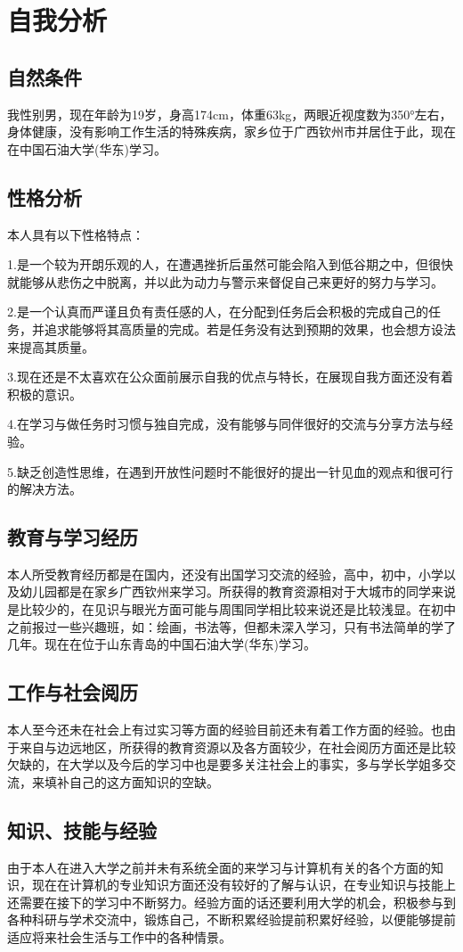 \documentclass{article}
\begin{document}
\thispagestyle{empty}
\newpage
\setcounter{page}{1}
\section{自我分析}
\subsection{自然条件}
我性别男，现在年龄为19岁，身高174cm，体重63kg，两眼近视度数为350°左右，身体健康，没有影响工作生活的特殊疾病，家乡位于广西钦州市并居住于此，现在在中国石油大学(华东)学习。
\subsection{性格分析}
本人具有以下性格特点：\par
1.是一个较为开朗乐观的人，在遭遇挫折后虽然可能会陷入到低谷期之中，但很快就能够从悲伤之中脱离，并以此为动力与警示来督促自己来更好的努力与学习。\par
2.是一个认真而严谨且负有责任感的人，在分配到任务后会积极的完成自己的任务，并追求能够将其高质量的完成。若是任务没有达到预期的效果，也会想方设法来提高其质量。\par
3.现在还是不太喜欢在公众面前展示自我的优点与特长，在展现自我方面还没有着积极的意识。\par
4.在学习与做任务时习惯与独自完成，没有能够与同伴很好的交流与分享方法与经验。\par
5.缺乏创造性思维，在遇到开放性问题时不能很好的提出一针见血的观点和很可行的解决方法。
\subsection{教育与学习经历}
本人所受教育经历都是在国内，还没有出国学习交流的经验，高中，初中，小学以及幼儿园都是在家乡广西钦州来学习。所获得的教育资源相对于大城市的同学来说是比较少的，在见识与眼光方面可能与周围同学相比较来说还是比较浅显。在初中之前报过一些兴趣班，如：绘画，书法等，但都未深入学习，只有书法简单的学了几年。现在在位于山东青岛的中国石油大学(华东)学习。
\subsection{工作与社会阅历}
本人至今还未在社会上有过实习等方面的经验目前还未有着工作方面的经验。也由于来自与边远地区，所获得的教育资源以及各方面较少，在社会阅历方面还是比较欠缺的，在大学以及今后的学习中也是要多关注社会上的事实，多与学长学姐多交流，来填补自己的这方面知识的空缺。
\subsection{知识、技能与经验}
由于本人在进入大学之前并未有系统全面的来学习与计算机有关的各个方面的知识，现在在计算机的专业知识方面还没有较好的了解与认识，在专业知识与技能上还需要在接下的学习中不断努力。经验方面的话还要利用大学的机会，积极参与到各种科研与学术交流中，锻炼自己，不断积累经验提前积累好经验，以便能够提前适应将来社会生活与工作中的各种情景。
\end{document}
